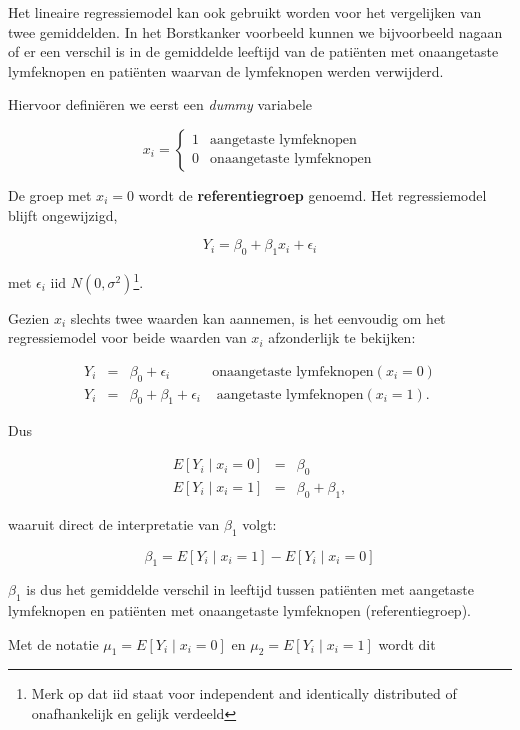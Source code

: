 \documentclass[
  12pt,dutch,coursenotes]{book}
\theoremstyle{definition}
\theoremstyle{definition}
\theoremstyle{definition}
\theoremstyle{remark}
\begin{document}
Het lineaire regressiemodel kan ook gebruikt worden voor het vergelijken van twee gemiddelden.
In het Borstkanker voorbeeld kunnen we bijvoorbeeld nagaan of er een verschil is in de gemiddelde leeftijd van de patiënten met onaangetaste lymfeknopen en patiënten waarvan de lymfeknopen werden verwijderd.

Hiervoor definiëren we eerst een \emph{dummy} variabele

\[x_i = \left\{ \begin{array}{ll}
1 & \text{aangetaste lymfeknopen} \\
0 & \text{onaangetaste lymfeknopen} \end{array}\right.\]

De groep met \(x_i=0\) wordt de \textbf{referentiegroep} genoemd.
Het regressiemodel blijft ongewijzigd,

\[Y_i = \beta_0 + \beta_1 x_i +\epsilon_i\]

met \(\epsilon_i \text{ iid } N(0,\sigma^2)\)\footnote{Merk op dat iid staat voor independent and identically distributed of onafhankelijk en gelijk verdeeld}.

Gezien \(x_i\) slechts twee waarden kan aannemen, is het eenvoudig om het regressiemodel voor beide waarden van \(x_i\) afzonderlijk te bekijken:

\[\begin{array}{lcll}
   Y_i &=& \beta_0 +\epsilon_i &\text{onaangetaste lymfeknopen} (x_i=0) \\
   Y_i &=& \beta_0 + \beta_1 +\epsilon_i &\text{ aangetaste lymfeknopen} (x_i=1) .
 \end{array}\]

Dus

\begin{eqnarray*}
   E\left[Y_i\mid x_i=0\right] &=& \beta_0 \\
   E\left[Y_i\mid x_i=1\right] &=& \beta_0 + \beta_1,
\end{eqnarray*}

waaruit direct de interpretatie van \(\beta_1\) volgt:

\[   \beta_1 = E\left[Y_i\mid x_i=1\right]-E\left[Y_i\mid x_i=0\right]\]

\(\beta_1\) is dus het gemiddelde verschil in leeftijd tussen patiënten met aangetaste lymfeknopen en patiënten met onaangetaste lymfeknopen (referentiegroep).

Met de notatie \(\mu_1= E\left[Y_i\mid x_i=0\right]\) en \(\mu_2= E\left[Y_i\mid x_i=1\right]\) wordt dit
\end{document}
